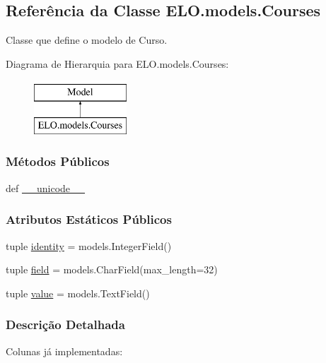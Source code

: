 \hypertarget{classELO_1_1models_1_1Courses}{\subsection{Referência da Classe E\-L\-O.\-models.\-Courses}
\label{classELO_1_1models_1_1Courses}
}


Classe que define o modelo de Curso.  


Diagrama de Hierarquia para E\-L\-O.\-models.\-Courses\-:\begin{figure}[H]
\begin{center}
\leavevmode
\includegraphics[height=2.000000cm]{dd/dd9/classELO_1_1models_1_1Courses}
\end{center}
\end{figure}
\subsubsection*{Métodos Públicos}
\begin{DoxyCompactItemize}
\item 
def \hyperlink{classELO_1_1models_1_1Courses_a8926a37152be8d4fc3e0ba6af200f871}{\-\_\-\-\_\-unicode\-\_\-\-\_\-}
\end{DoxyCompactItemize}
\subsubsection*{Atributos Estáticos Públicos}
\begin{DoxyCompactItemize}
\item 
tuple \hyperlink{classELO_1_1models_1_1Courses_a83d1bd0bc45319f3b88446f87f42a03e}{identity} = models.\-Integer\-Field()
\item 
tuple \hyperlink{classELO_1_1models_1_1Courses_a0ecbb317d4d82d5630b7a16a1df1711d}{field} = models.\-Char\-Field(max\-\_\-length=32)
\item 
tuple \hyperlink{classELO_1_1models_1_1Courses_a2b3c228ef67c767570b3555b3b7f1de2}{value} = models.\-Text\-Field()
\end{DoxyCompactItemize}


\subsubsection{Descrição Detalhada}
Colunas já implementadas\-:

